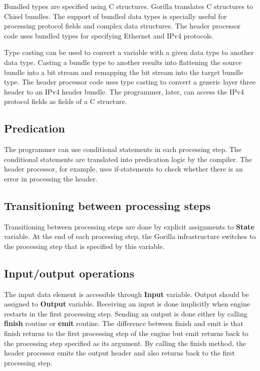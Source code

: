 \documentclass[a4paper, 12pt]{report}
\begin{document}
Bundled types are specified using C structures. Gorilla translates 
C structures to Chisel bundles. The support of bundled data types 
is specially useful for processing protocol fields and complex data 
structures. The header processor code uses bundled types for 
specifying Ethernet and IPv4 protocols.  

Type casting can be used to convert a variable with 
a given data type to another data type.
Casting a bundle type to another results into 
flattening the source bundle into a bit stream and 
remapping the bit stream into the target bundle type.
The header processor code uses type casting to convert 
a generic layer three header to an IPv4 header bundle.
The programmer, later, can access the IPv4 protocol 
fields as fields of a C structure.
 
\subsection{Predication}
The programmer can use conditional statements in 
each processing step. The conditional statements 
are translated into predication logic by the compiler.
The header processor, for example, uses if-statements 
to check whether there is an error in processing the 
header.

\subsection{Transitioning between processing steps}
Transitioning between processing steps are done 
by explicit assignments to {\bf State} variable.
At the end of each processing step, the Gorilla 
infrastructure switches to the processing step that 
is specified by this variable.

\subsection{Input/output operations}
The input data element is accessible through   
{\bf Input} variable. Output should be assigned 
to {\bf Output} variable. 
Receiving an input is done implicitly when engine 
restarts in the first processing step. Sending an 
output is done either by calling {\bf finish} 
routine or {\bf emit} routine. The difference 
between finish and emit is that finish returns 
to the first processing step of the engine but 
emit returns back to the processing step specified 
as its argument.  
By calling the finish method, the header processor 
emits the output header and also returns back to the 
first processing step.
\end{document}
